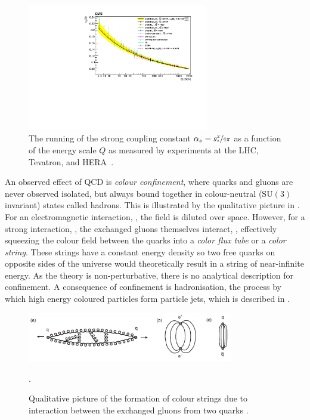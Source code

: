 \begin{figure}[h]
	\centering
	\includegraphics[width=0.7\textwidth]{Figures/standard_model/running}
	\caption{The running of the strong coupling constant $\alpha_s = \sfrac{g_s^2}{4\pi}$ as a function of the energy scale $Q$ as measured by experiments at the LHC, Tevatron, and HERA~\cite{CMSRunning}.}
	\label{fig:asymptotic_freedom}
\end{figure}

An observed effect of QCD is \textit{colour confinement}, where quarks and gluons are never observed isolated, but always bound together in colour-neutral ($\text{SU}(3)$ invariant) states called hadrons.
This is illustrated by the qualitative picture in .
For an electromagnetic interaction, , the field is diluted over space.
However, for a strong interaction, , the exchanged gluons themselves interact, , effectively squeezing the colour field between the quarks into a \textit{color flux tube} or a \textit{color string}.
These strings have a constant energy density so two free quarks on opposite sides of the universe would theoretically result in a string of near-infinite energy.
As the theory is non-perturbative, there is no analytical description for confinement.
A consequence of confinement is hadronisation, the process by which high energy coloured particles form particle jets, which is described in .

\begin{figure}[h]
	\centering
	\includegraphics[width=0.8\textwidth]{Figures/standard_model/confinement.pdf}
	\begin{subfigure}{0pt}\label{fig:confinement_a}\end{subfigure}
	\begin{subfigure}{0pt}\label{fig:confinement_b}\end{subfigure}
	\begin{subfigure}{0pt}\label{fig:confinement_c}\end{subfigure}
	\caption{Qualitative picture of the formation of colour strings due to interaction between the exchanged gluons from two quarks \cite{ModernParticlePhysics}.}.
	\label{fig:confinement}
\end{figure}

